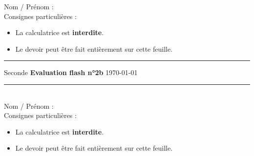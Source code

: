 


\pagestyle{fancy}
\fancyhead[R]{\today}

\reversemarginpar

\null\vspace{-30pt}
Nom / Prénom : \\

Consignes particulières : 
\begin{itemize}[label=$\bullet$]
	\item 
	La calculatrice est \textbf{interdite}.
	\item 
	Le devoir peut être fait entièrement sur cette feuille.
\end{itemize}

\hrule






\setcounter{Exercise}{0}

\begin{flushleft}{Seconde} \hfill
\textbf{Evaluation flash n°2b} \hfill
\today\end{flushleft}
\vspace{-10pt}
\hrule  ~\\

\null\vspace{-30pt}
Nom / Prénom : \\

Consignes particulières : 
\begin{itemize}[label=$\bullet$]
	\item 
	La calculatrice est \textbf{interdite}.
	\item 
	Le devoir peut être fait entièrement sur cette feuille.
\end{itemize}

